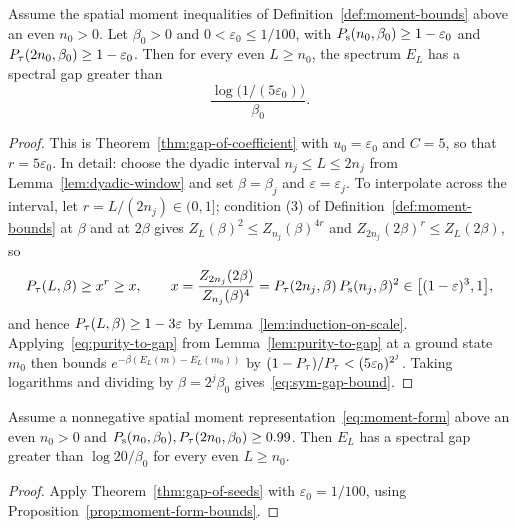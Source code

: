 \begin{theorem}
  \label{thm:gap-of-seeds}
  \leanok
  Assume the spatial moment inequalities of Definition~\ref{def:moment-bounds} above an even
  \(n_0 > 0\). Let \(\beta_0 > 0\) and \(0 < \varepsilon_0 \le 1/100\), with
  \(P_{\mathrm{s}}(n_0, \beta_0) \ge 1 - \varepsilon_0\) and \(P_{\tau}(2n_0, \beta_0) \ge 1 - \varepsilon_0\).
  Then for every even \(L \ge n_0\), the spectrum \(E_L\) has a spectral gap greater than
  \begin{equation}
    \label{eq:sym-gap-bound}
    \frac{\log\bigl(1/(5\varepsilon_0)\bigr)}{\beta_0}.
  \end{equation}
\end{theorem}
\begin{proof}
  \leanok
  This is Theorem~\ref{thm:gap-of-coefficient} with \(u_0 = \varepsilon_0\) and \(C = 5\), so that
  \(r = 5\varepsilon_0\). In detail: choose the dyadic interval \(n_j \le L \le 2n_j\) from
  Lemma~\ref{lem:dyadic-window} and set \(\beta = \beta_j\) and \(\varepsilon = \varepsilon_j\). To
  interpolate across the interval, let \(r = L/(2n_j) \in (0, 1]\); condition (3) of
  Definition~\ref{def:moment-bounds} at \(\beta\) and at \(2\beta\) gives
  \(Z_L(\beta)^2 \le Z_{n_j}(\beta)^{4r}\) and \(Z_{2n_j}(2\beta)^r \le Z_L(2\beta)\), so
  \begin{equation}
    \label{eq:dyadic-interp}
    P_{\tau}(L, \beta) \ge x^r \ge x, \qquad
    x = \frac{Z_{2n_j}(2\beta)}{Z_{n_j}(\beta)^4} = P_{\tau}(2n_j, \beta)\, P_{\mathrm{s}}(n_j, \beta)^2
      \in \bigl[(1-\varepsilon)^3, 1\bigr],
  \end{equation}
  and hence \(P_{\tau}(L, \beta) \ge 1 - 3\varepsilon\) by Lemma~\ref{lem:induction-on-scale}.
  Applying~\eqref{eq:purity-to-gap} from Lemma~\ref{lem:purity-to-gap} at a ground state \(m_0\)
  then bounds \(e^{-\beta (E_L(m) - E_L(m_0))}\) by \((1 - P_{\tau})/P_{\tau} < (5\varepsilon_0)^{2^j}\).
  Taking logarithms and dividing by \(\beta = 2^j \beta_0\) gives~\eqref{eq:sym-gap-bound}.
\end{proof}

\begin{corollary}
  \label{cor:gap-of-purities}
  \leanok
  Assume a nonnegative spatial moment representation~\eqref{eq:moment-form} above an even
  \(n_0 > 0\) and \(P_{\mathrm{s}}(n_0, \beta_0), P_{\tau}(2n_0, \beta_0) \ge 0.99\). Then \(E_L\) has a spectral
  gap greater than \(\log 20 / \beta_0\) for every even \(L \ge n_0\).
\end{corollary}
\begin{proof}
  \leanok
  Apply Theorem~\ref{thm:gap-of-seeds} with \(\varepsilon_0 = 1/100\), using
  Proposition~\ref{prop:moment-form-bounds}.
\end{proof}
